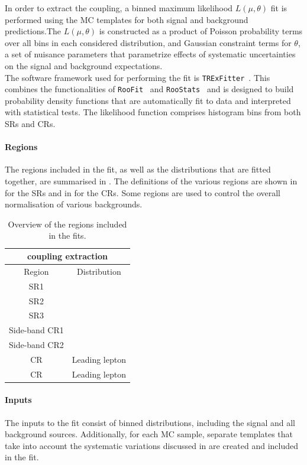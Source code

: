 In order to extract the \tZc coupling, a binned maximum
likelihood $L(\mu,\theta)$ fit is performed using the MC templates for both signal and
background predictions.The $L(\mu,\theta)$ is constructed as a product of Poisson
probability terms over all bins in each considered distribution, and Gaussian constraint terms
for $\theta$, a set of nuisance parameters that parametrize effects of systematic uncertainties on the signal and background expectations.\\
The software framework used for performing the fit is \texttt{TRExFitter}~\cite{TRexfitter}.
This combines the functionalities of
\texttt{RooFit}~\cite{Verkerke:2003ir} and
\texttt{RooStats}~\cite{Moneta:2010pm} and is designed to build
probability density functions that are automatically fit to data and
interpreted with statistical tests.
The likelihood function comprises histogram bins from both SRs and
CRs.

\paragraph{Regions} The regions included in the fit, as well as the
distributions that are fitted together, are summarised in .
The definitions of the various regions are shown in
 for the SRs and in  for the CRs. 
Some regions are used to control the overall normalisation of various
backgrounds.

\begin{table}[htbp]
	\small
	\centering
	\begin{tabular}{cc}
		\toprule
		\multicolumn{2}{c}{\tZc coupling extraction} \\
		\midrule
		Region & Distribution \\
		\midrule
		SR1 \tZc & \Done  \\
		SR2 \tZc & \DtwoC  \\
		SR3 \tZc & \Dthree  \\
		Side-band CR1 \tZc & \Done  \\
		Side-band CR2 & \DtwoC  \\
		\ttZ CR & Leading lepton \pt  \\
		\ttbar CR & Leading lepton \pt  \\
		\bottomrule
	\end{tabular}
	\caption{
	Overview of the regions included in the fits.}%
\label{tab:fitregions}
\end{table}

\paragraph{Inputs} The inputs to the fit consist of binned
distributions, including the signal and all background sources.
Additionally, for each MC sample, separate templates that take into
account the systematic variations discussed in 
are created and included in the fit. 

